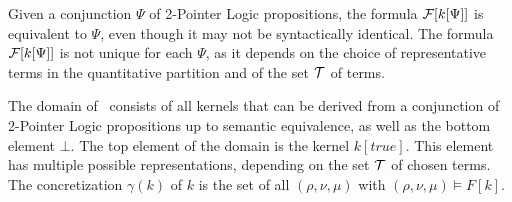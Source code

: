Given a conjunction $\Psi$ of 2-Pointer Logic propositions, the formula $\mathcal{F}[k[\Psi]]$ is equivalent to $\Psi$, even though it may not be syntactically identical.
The formula $\mathcal{F}[k[\Psi]]$ is not unique for each $\Psi$, as it depends on the choice of representative terms in the quantitative partition and of the set $\mathcal{T}$ of terms.

The domain of \cpo\ consists of all kernels that can be derived from a conjunction of 2-Pointer Logic propositions up to semantic equivalence, as well as the bottom element $\bot$.
The top element of the domain is the kernel $k[true]$.
This element has multiple possible representations, depending on the set $\mathcal{T}$ of chosen terms.
The concretization $\gamma(k)$ of $k$ is the set of all $(\rho, \nu, \mu)$ with $(\rho, \nu, \mu) \models F[k]$.



